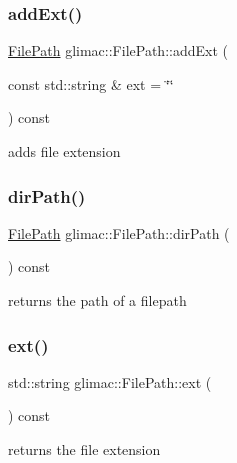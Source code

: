 \subsubsection{\texorpdfstring{add\+Ext()}{addExt()}}
{\footnotesize\ttfamily \hyperlink{classglimac_1_1FilePath}{File\+Path} glimac\+::\+File\+Path\+::add\+Ext (\begin{DoxyParamCaption}\item[{const std\+::string \&}]{ext = {\ttfamily \char`\"{}\char`\"{}} }\end{DoxyParamCaption}) const\hspace{0.3cm}{\ttfamily [inline]}}

adds file extension \mbox{\label{classglimac_1_1FilePath_a75d8d5573b69d79dd745513ddd4b158f}} 
\subsubsection{\texorpdfstring{dir\+Path()}{dirPath()}}
{\footnotesize\ttfamily \hyperlink{classglimac_1_1FilePath}{File\+Path} glimac\+::\+File\+Path\+::dir\+Path (\begin{DoxyParamCaption}{ }\end{DoxyParamCaption}) const\hspace{0.3cm}{\ttfamily [inline]}}

returns the path of a filepath \mbox{\label{classglimac_1_1FilePath_ac36e170d0864ed2c5f1296dac2104b15}} 
\subsubsection{\texorpdfstring{ext()}{ext()}}
{\footnotesize\ttfamily std\+::string glimac\+::\+File\+Path\+::ext (\begin{DoxyParamCaption}{ }\end{DoxyParamCaption}) const\hspace{0.3cm}{\ttfamily [inline]}}

returns the file extension \mbox{\label{classglimac_1_1FilePath_af62ce630c3e3a5e106556cdf17773f3a}} 
